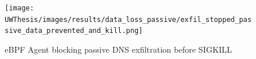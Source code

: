 \documentclass [11pt, proquest] {uwthesis}[2020/02/24]
\begin{document}
\begin{figure}[H]
  \centering
  \texttt{[image: UWThesis/images/results/data\_loss\_passive/exfil\_stopped\_passive\_data\_prevented\_and\_kill.png]}
\caption{eBPF Agent blocking passive DNS exfiltration before SIGKILL}
  \label{fig:data_loss_prev}
\end{figure}

\end{document}
